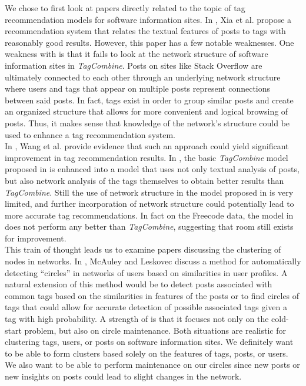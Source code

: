 \documentclass[11pt, final]{article}
\newcommand{\br}[1][.75]{\ \\[#1\baselineskip]}
\begin{document}
We chose to first look at papers directly related to the topic of tag recommendation models for software information sites. In \cite{1}, Xia et al. propose a recommendation system that relates the textual features of posts to tags with reasonably good results. However, this paper has a few notable weaknesses. One weakness with \cite{1} is that it fails to look at the network structure of software information sites in \textit{TagCombine}. Posts on sites like Stack Overflow are ultimately connected to each other through an underlying network structure where users and tags that appear on multiple posts represent connections between said posts. In fact, tags exist in order to group similar posts and create an organized structure that allows for more convenient and logical browsing of posts. Thus, it makes sense that knowledge of the network's structure could be used to enhance a tag recommendation system.\br
In \cite{5}, Wang et al. provide evidence that such an approach could yield significant improvement in tag recommendation results. In \cite{5}, the basic \textit{TagCombine} model proposed in \cite{1} is enhanced into a model that uses not only textual analysis of posts, but also network analysis of the tags themselves to obtain better results than \textit{TagCombine}. Still the use of network structure in the model proposed in \cite{5} is very limited, and further incorporation of network structure could potentially lead to more accurate tag recommendations. In fact on the Freecode data, the model in \cite{5} does not perform any better than \textit{TagCombine}, suggesting that room still exists for improvement.\br
This train of thought leads us to examine papers discussing the clustering of nodes in networks. In \cite{2}, McAuley and Leskovec discuss a method for automatically detecting ``circles'' in networks of users based on similarities in user profiles. A natural extension of this method would be to detect posts associated with common tags based on the similarities in features of the posts or to find circles of tags that could allow for accurate detection of possible associated tags given a tag with high probability. A strength of \cite{2} is that it focuses not only on the cold-start problem, but also on circle maintenance. Both situations are realistic for clustering tags, users, or posts on software information sites. We definitely want to be able to form clusters based solely on the features of tags, posts, or users. We also want to be able to perform maintenance on our circles since new posts or new insights on posts could lead to slight changes in the network.\br
\end{document}
